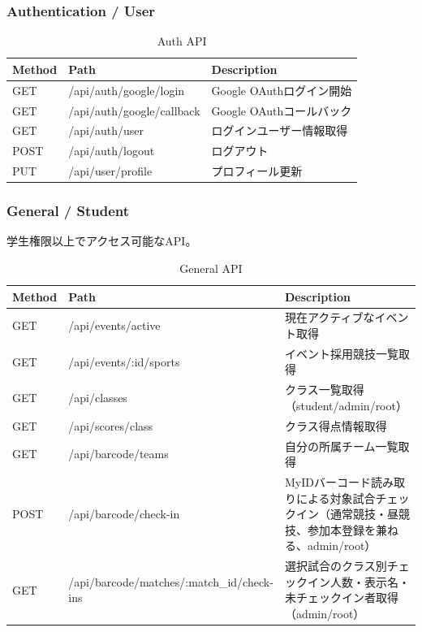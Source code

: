 \documentclass[paper=a4, fontsize=11pt]{jlreq}
\begin{document}
\subsubsection{Authentication / User}
\begin{table}[H]
    \centering
    \caption{Auth API}
    \begin{tabularx}{\textwidth}{|l|l|X|}
        \toprule
        Method & Path & Description \\
        \midrule
        GET & /api/auth/google/login & Google OAuthログイン開始 \\
        GET & /api/auth/google/callback & Google OAuthコールバック \\
        GET & /api/auth/user & ログインユーザー情報取得 \\
        POST & /api/auth/logout & ログアウト \\
        PUT & /api/user/profile & プロフィール更新 \\
        \bottomrule
    \end{tabularx}
\end{table}

\subsubsection{General / Student}
学生権限以上でアクセス可能なAPI。

\begin{table}[H]
    \centering
    \caption{General API}
    \begin{tabularx}{\textwidth}{|l|l|X|}
        \toprule
        Method & Path & Description \\
        \midrule
        GET & /api/events/active & 現在アクティブなイベント取得 \\
        GET & /api/events/:id/sports & イベント採用競技一覧取得 \\
        GET & /api/classes & クラス一覧取得（student/admin/root） \\
        GET & /api/scores/class & クラス得点情報取得 \\
        GET & /api/barcode/teams & 自分の所属チーム一覧取得 \\
        POST & /api/barcode/check-in & MyIDバーコード読み取りによる対象試合チェックイン（通常競技・昼競技、参加本登録を兼ねる、admin/root） \\
        GET & /api/barcode/matches/:match\_id/check-ins & 選択試合のクラス別チェックイン人数・表示名・未チェックイン者取得（admin/root） \\
        \bottomrule
    \end{tabularx}
\end{table}
\end{document}
